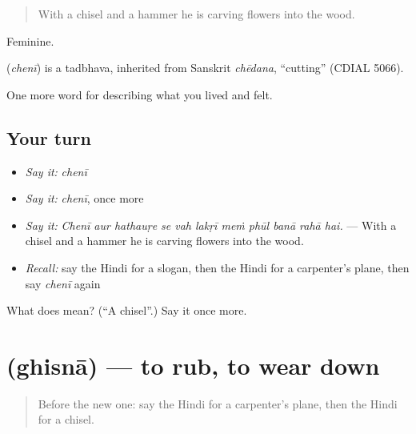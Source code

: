 \begin{quote}
With a chisel and a hammer he is carving flowers into the wood.
\end{quote}

Feminine.

\begin{cousinweb}
\textbf{} (\emph{chenī}) is a tadbhava, inherited from Sanskrit \emph{chēdana}, \textquotedblleft{}cutting\textquotedblright{} (CDIAL 5066).
\end{cousinweb}

\begin{grammarlens}[title={What you've built}]
One more word for describing what you lived and felt.
\end{grammarlens}

\subsection*{Your turn}
\begin{itemize}
\raggedright
  \item \emph{Say it:} \emph{chenī}
  \item \emph{Say it:} \emph{chenī}, once more
  \item \emph{Say it:} \emph{Chenī aur hathauṛe se vah lakṛī meṁ phūl banā rahā hai.} — With a chisel and a hammer he is carving flowers into the wood.
  \item \emph{Recall:} say the Hindi for a slogan, then the Hindi for a carpenter's plane, then say \emph{chenī} again
\end{itemize}

\begin{tcolorbox}[breakable,colback=teal!4,colframe=teal!35!black,title={Before you move on}]
What does  mean? (\textquotedblleft{}A chisel\textquotedblright{}.) Say it once more.
\end{tcolorbox}
\section[\texorpdfstring{\hi{घिसना} (ghisnā)}{घिसना (ghisnā)}]{ (ghisnā) — to rub, to wear down}

\label{lesson:HI-C510-ghisna}



\begin{quote}
Before the new one: say the Hindi for a carpenter's plane, then the Hindi for a chisel.
\end{quote}


